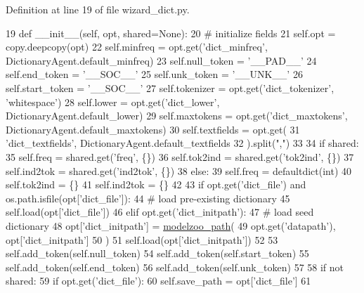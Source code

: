 Definition at line 19 of file wizard\+\_\+dict.\+py.


\begin{DoxyCode}
19     \textcolor{keyword}{def }\_\_init\_\_(self, opt, shared=None):
20         \textcolor{comment}{# initialize fields}
21         self.opt = copy.deepcopy(opt)
22         self.minfreq = opt.get(\textcolor{stringliteral}{'dict\_minfreq'}, DictionaryAgent.default\_minfreq)
23         self.null\_token = \textcolor{stringliteral}{'\_\_PAD\_\_'}
24         self.end\_token = \textcolor{stringliteral}{'\_\_SOC\_\_'}
25         self.unk\_token = \textcolor{stringliteral}{'\_\_UNK\_\_'}
26         self.start\_token = \textcolor{stringliteral}{'\_\_SOC\_\_'}
27         self.tokenizer = opt.get(\textcolor{stringliteral}{'dict\_tokenizer'}, \textcolor{stringliteral}{'whitespace'})
28         self.lower = opt.get(\textcolor{stringliteral}{'dict\_lower'}, DictionaryAgent.default\_lower)
29         self.maxtokens = opt.get(\textcolor{stringliteral}{'dict\_maxtokens'}, DictionaryAgent.default\_maxtokens)
30         self.textfields = opt.get(
31             \textcolor{stringliteral}{'dict\_textfields'}, DictionaryAgent.default\_textfields
32         ).split(\textcolor{stringliteral}{","})
33 
34         \textcolor{keywordflow}{if} shared:
35             self.freq = shared.get(\textcolor{stringliteral}{'freq'}, \{\})
36             self.tok2ind = shared.get(\textcolor{stringliteral}{'tok2ind'}, \{\})
37             self.ind2tok = shared.get(\textcolor{stringliteral}{'ind2tok'}, \{\})
38         \textcolor{keywordflow}{else}:
39             self.freq = defaultdict(int)
40             self.tok2ind = \{\}
41             self.ind2tok = \{\}
42 
43             \textcolor{keywordflow}{if} opt.get(\textcolor{stringliteral}{'dict\_file'}) \textcolor{keywordflow}{and} os.path.isfile(opt[\textcolor{stringliteral}{'dict\_file'}]):
44                 \textcolor{comment}{# load pre-existing dictionary}
45                 self.load(opt[\textcolor{stringliteral}{'dict\_file'}])
46             \textcolor{keywordflow}{elif} opt.get(\textcolor{stringliteral}{'dict\_initpath'}):
47                 \textcolor{comment}{# load seed dictionary}
48                 opt[\textcolor{stringliteral}{'dict\_initpath'}] = \hyperlink{namespaceparlai_1_1agents_1_1legacy__agents_1_1seq2seq_1_1utils__v0_a5fbd3301b67f00d6d146fb01c7cd7626}{modelzoo\_path}(
49                     opt.get(\textcolor{stringliteral}{'datapath'}), opt[\textcolor{stringliteral}{'dict\_initpath'}]
50                 )
51                 self.load(opt[\textcolor{stringliteral}{'dict\_initpath'}])
52 
53             self.add\_token(self.null\_token)
54             self.add\_token(self.start\_token)
55             self.add\_token(self.end\_token)
56             self.add\_token(self.unk\_token)
57 
58         \textcolor{keywordflow}{if} \textcolor{keywordflow}{not} shared:
59             \textcolor{keywordflow}{if} opt.get(\textcolor{stringliteral}{'dict\_file'}):
60                 self.save\_path = opt[\textcolor{stringliteral}{'dict\_file'}]
61 
\end{DoxyCode}


